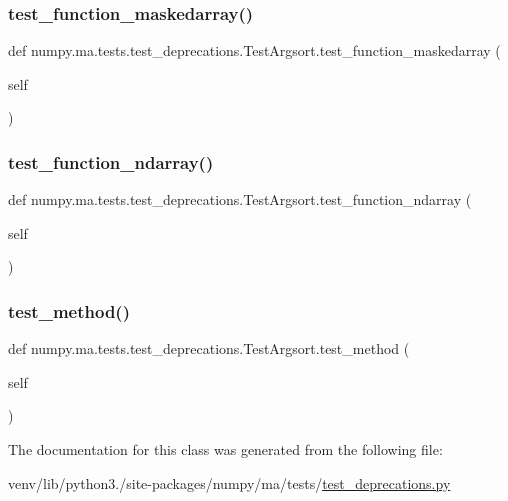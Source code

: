\subsubsection{\texorpdfstring{test\+\_\+function\+\_\+maskedarray()}{test\_function\_maskedarray()}}
{\footnotesize\ttfamily def numpy.\+ma.\+tests.\+test\+\_\+deprecations.\+Test\+Argsort.\+test\+\_\+function\+\_\+maskedarray (\begin{DoxyParamCaption}\item[{}]{self }\end{DoxyParamCaption})}

\mbox{\label{classnumpy_1_1ma_1_1tests_1_1test__deprecations_1_1TestArgsort_af155b242fbc0baf810e2cff29d0bdf06}} 
\subsubsection{\texorpdfstring{test\+\_\+function\+\_\+ndarray()}{test\_function\_ndarray()}}
{\footnotesize\ttfamily def numpy.\+ma.\+tests.\+test\+\_\+deprecations.\+Test\+Argsort.\+test\+\_\+function\+\_\+ndarray (\begin{DoxyParamCaption}\item[{}]{self }\end{DoxyParamCaption})}

\mbox{\label{classnumpy_1_1ma_1_1tests_1_1test__deprecations_1_1TestArgsort_af26de0bebd8058d720d9f08c217e6954}} 
\subsubsection{\texorpdfstring{test\+\_\+method()}{test\_method()}}
{\footnotesize\ttfamily def numpy.\+ma.\+tests.\+test\+\_\+deprecations.\+Test\+Argsort.\+test\+\_\+method (\begin{DoxyParamCaption}\item[{}]{self }\end{DoxyParamCaption})}



The documentation for this class was generated from the following file\+:\begin{DoxyCompactItemize}
\item 
venv/lib/python3./site-\/packages/numpy/ma/tests/\hyperlink{ma_2tests_2test__deprecations_8py}{test\+\_\+deprecations.\+py}\end{DoxyCompactItemize}
